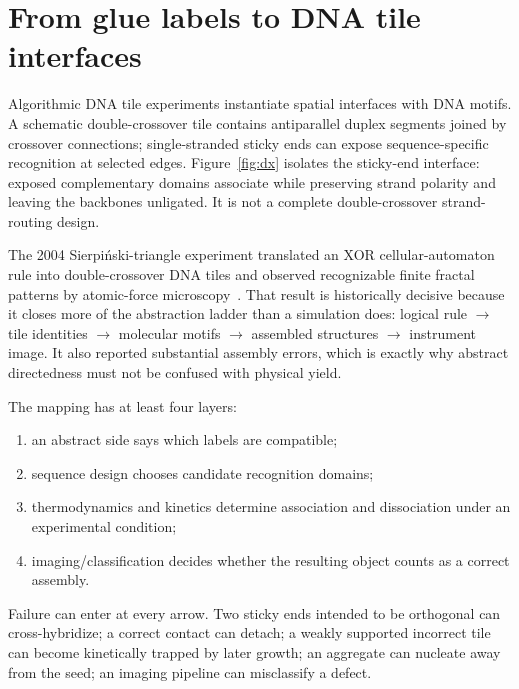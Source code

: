 \section{From glue labels to DNA tile interfaces}

Algorithmic DNA tile experiments instantiate spatial interfaces with DNA motifs.
A schematic double-crossover tile contains antiparallel duplex segments joined
by crossover connections; single-stranded sticky ends can expose sequence-specific
recognition at selected edges. Figure~\ref{fig:dx} isolates the sticky-end
interface: exposed complementary domains associate while preserving strand
polarity and leaving the backbones unligated. It is not a complete
double-crossover strand-routing design.


The 2004 Sierpiński-triangle experiment translated an XOR cellular-automaton
rule into double-crossover DNA tiles and observed recognizable finite fractal
patterns by atomic-force microscopy~\cite{Rothemund2004}. That result is historically decisive
because it closes more of the abstraction ladder than a simulation does:
logical rule $\rightarrow$ tile identities $\rightarrow$ molecular motifs
$\rightarrow$ assembled structures $\rightarrow$ instrument image. It also
reported substantial assembly errors, which is exactly why abstract
directedness must not be confused with physical yield.

The mapping has at least four layers:
\begin{enumerate}
\item an abstract side says which labels are compatible;
\item sequence design chooses candidate recognition domains;
\item thermodynamics and kinetics determine association and dissociation under
      an experimental condition;
\item imaging/classification decides whether the resulting object counts as a
      correct assembly.
\end{enumerate}
Failure can enter at every arrow. Two sticky ends intended to be orthogonal can
cross-hybridize; a correct contact can detach; a weakly supported incorrect tile
can become kinetically trapped by later growth; an aggregate can nucleate away
from the seed; an imaging pipeline can misclassify a defect.

